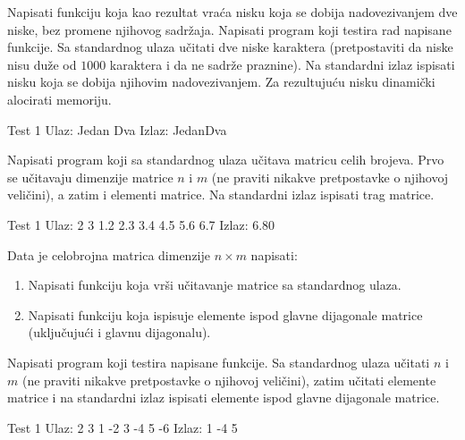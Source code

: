 \begin{Exercise}[label=329]
Napisati funkciju koja kao rezultat vraća nisku koja se dobija
nadovezivanjem dve niske, bez promene njihovog sadržaja.
Napisati program koji testira rad napisane funkcije. Sa
standardnog ulaza učitati dve niske karaktera (pretpostaviti da 
niske nisu duže od $1000$ karaktera i da ne sadrže praznine). Na 
standardni izlaz ispisati nisku koja se dobija njihovim nadovezivanjem. 
Za rezultujuću nisku dinamički alocirati memoriju.

\begin{minitest}
\begin{test}{Test 1}
Ulaz:  Jedan Dva       
Izlaz: JedanDva
\end{test}
\end{minitest}

\end{Exercise}
\begin{Answer}[ref=329]
\end{Answer}

\begin{Exercise}[label=331]
Napisati program koji sa standardnog ulaza učitava matricu
celih brojeva. Prvo se učitavaju dimenzije matrice $n$ i
$m$ (ne praviti nikakve pretpostavke o njihovoj veličini),
a zatim i elementi matrice. Na standardni izlaz ispisati trag
matrice.

\begin{miditest}
\begin{test}{Test 1}
Ulaz:  2 3
       1.2 2.3 3.4
       4.5 5.6 6.7
Izlaz: 6.80
\end{test}
\end{miditest}
\end{Exercise}
\begin{Answer}[ref=331]
\end{Answer}

\begin{Exercise}[label=332]
Data je celobrojna matrica dimenzije $n \times m$ napisati:
\begin{enumerate}
\item Napisati funkciju koja vrši učitavanje matrice sa standardnog ulaza.
\item Napisati funkciju koja ispisuje elemente ispod glavne dijagonale matrice 
(uključujući i glavnu dijagonalu).
\end{enumerate}
Napisati program koji testira napisane funkcije. Sa standardnog
ulaza učitati $n$ i $m$ (ne praviti nikakve
pretpostavke o njihovoj veličini), zatim učitati elemente
matrice i na standardni izlaz ispisati elemente ispod glavne
dijagonale matrice.

\begin{miditest}
\begin{test}{Test 1}
Ulaz:  2 3
       1 -2 3
       -4 5 -6
Izlaz: 1
       -4 5
\end{test}
\end{miditest}
\end{Exercise}
\begin{Answer}[ref=332]
\end{Answer}


